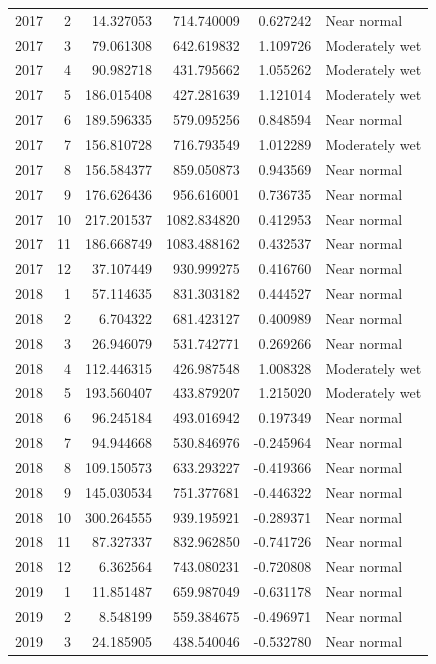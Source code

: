 \begin{tabular}{rrrrrl}
2017 & 2 & 14.327053 & 714.740009 & 0.627242 & Near normal \\
2017 & 3 & 79.061308 & 642.619832 & 1.109726 & Moderately wet \\
2017 & 4 & 90.982718 & 431.795662 & 1.055262 & Moderately wet \\
2017 & 5 & 186.015408 & 427.281639 & 1.121014 & Moderately wet \\
2017 & 6 & 189.596335 & 579.095256 & 0.848594 & Near normal \\
2017 & 7 & 156.810728 & 716.793549 & 1.012289 & Moderately wet \\
2017 & 8 & 156.584377 & 859.050873 & 0.943569 & Near normal \\
2017 & 9 & 176.626436 & 956.616001 & 0.736735 & Near normal \\
2017 & 10 & 217.201537 & 1082.834820 & 0.412953 & Near normal \\
2017 & 11 & 186.668749 & 1083.488162 & 0.432537 & Near normal \\
2017 & 12 & 37.107449 & 930.999275 & 0.416760 & Near normal \\
2018 & 1 & 57.114635 & 831.303182 & 0.444527 & Near normal \\
2018 & 2 & 6.704322 & 681.423127 & 0.400989 & Near normal \\
2018 & 3 & 26.946079 & 531.742771 & 0.269266 & Near normal \\
2018 & 4 & 112.446315 & 426.987548 & 1.008328 & Moderately wet \\
2018 & 5 & 193.560407 & 433.879207 & 1.215020 & Moderately wet \\
2018 & 6 & 96.245184 & 493.016942 & 0.197349 & Near normal \\
2018 & 7 & 94.944668 & 530.846976 & -0.245964 & Near normal \\
2018 & 8 & 109.150573 & 633.293227 & -0.419366 & Near normal \\
2018 & 9 & 145.030534 & 751.377681 & -0.446322 & Near normal \\
2018 & 10 & 300.264555 & 939.195921 & -0.289371 & Near normal \\
2018 & 11 & 87.327337 & 832.962850 & -0.741726 & Near normal \\
2018 & 12 & 6.362564 & 743.080231 & -0.720808 & Near normal \\
2019 & 1 & 11.851487 & 659.987049 & -0.631178 & Near normal \\
2019 & 2 & 8.548199 & 559.384675 & -0.496971 & Near normal \\
2019 & 3 & 24.185905 & 438.540046 & -0.532780 & Near normal \\

\end{tabular}

